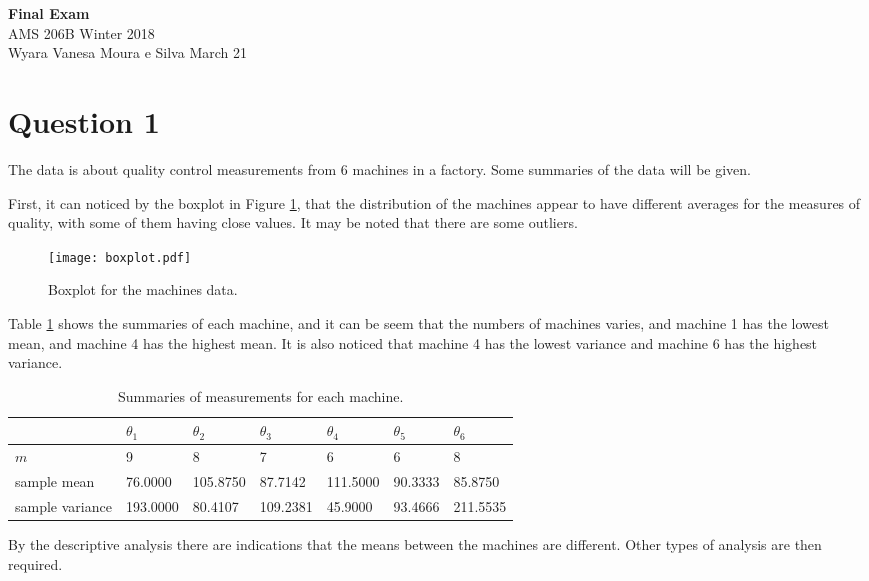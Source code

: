 \documentclass[a4paper, 11pt]{article}
\begin{document}
\noindent
{\Large\textbf{Final Exam} \hfill \\
AMS 206B \hfill Winter 2018 \\
Wyara Vanesa Moura e Silva \hfill March 21\\}

\section*{Question 1}

The data is about quality control measurements from 6 machines in a factory. Some summaries of the data will be given.

First, it can noticed by the boxplot in Figure \ref{Fig1}, that the distribution of the machines appear to have different averages for the measures of quality, with some of them having close values. It may be noted that there are some outliers.

\begin{figure}[H]
\centering
\caption{Boxplot for the machines data.}
\label{Fig1}
\texttt{[image: boxplot.pdf]}
\end{figure}

Table \ref{tab4} shows the summaries of each machine, and it can be seem that the numbers of machines varies, and machine 1 has the lowest mean, and machine 4 has the highest mean. It is also noticed that machine 4 has the lowest variance and machine 6 has the highest variance.

\begin{table}[H]
\centering
\begin{tabular}{lllllll}
\hline
& $\theta_1$  & $\theta_2$ & $\theta_3$ & $\theta_4$ & $\theta_5$ & $\theta_6$ \\
\hline
$m$ & 9 & 8 & 7 & 6 & 6 & 8 \\
sample mean & 76.0000     & 105.8750    & 87.7142      & 111.5000     & 90.3333     & 85.8750      \\    
sample variance & 193.0000 & 80.4107 & 109.2381 &  45.9000 & 93.4666 & 211.5535 \\
\hline
\end{tabular}
\caption{Summaries of measurements for each machine.}
\label{tab4}
\end{table}

By the descriptive analysis there are indications that the means between the machines are different. Other types of analysis are then required.
\end{document}
